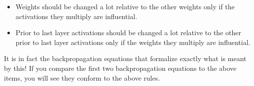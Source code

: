 \documentclass{article}
\begin{document}
	\begin{itemize}
		\item Weights should be changed a lot relative to the other weights only if the activations they multiply are influential.
		\item Prior to last layer activations should be changed a lot relative to the other prior to last layer activations only if the weights they multiply are influential.
	\end{itemize}
	
	It is in fact the backpropagation equations that formalize exactly what is meant by this! If you compare the first two backpropagation equations to the above items, you will see they conform to the above rules.
\end{document}
